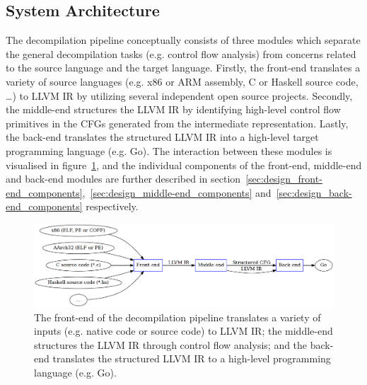 


\subsection{System Architecture}
\label{sec:design_system_architecture}

The decompilation pipeline conceptually consists of three modules which separate the general decompilation tasks (e.g. control flow analysis) from concerns related to the source language and the target language. Firstly, the front-end translates a variety of source languages (e.g. x86 or ARM assembly, C or Haskell source code, …) to LLVM IR by utilizing several independent open source projects. Secondly, the middle-end structures the LLVM IR by identifying high-level control flow primitives in the CFGs generated from the intermediate representation. Lastly, the back-end translates the structured LLVM IR into a high-level target programming language (e.g. Go). The interaction between these modules is visualised in figure~\ref{fig:decompilation_pipeline}, and the individual components of the front-end, middle-end and back-end modules are further described in section~\ref{sec:design_front-end_components},~\ref{sec:design_middle-end_components} and~\ref{sec:design_back-end_components} respectively.

\begin{figure}[htbp]
	\begin{center}
		\includegraphics[width=\textwidth]{inc/6_design/decompilation_pipeline.png}
		\caption{The front-end of the decompilation pipeline translates a variety of inputs (e.g. native code or source code) to LLVM IR; the middle-end structures the LLVM IR through control flow analysis; and the back-end translates the structured LLVM IR to a high-level programming language (e.g. Go).}
		\label{fig:decompilation_pipeline}
	\end{center}
\end{figure}

